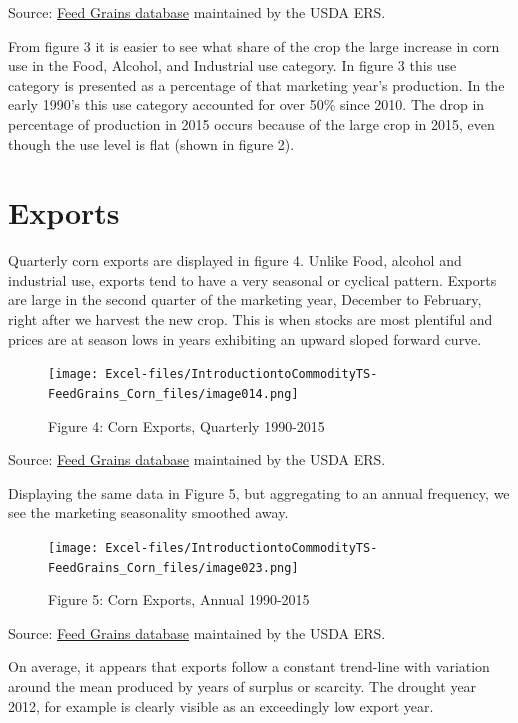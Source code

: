 \documentclass[
]{book}
\begin{document}
Source: \href{http://www.ers.usda.gov/data-products/feed-grains-database/feed-grains-yearbook-tables.aspx\#26780}{Feed Grains database} maintained by the USDA ERS.

From figure 3 it is easier to see what share of the crop the large increase in corn use in the Food, Alcohol, and Industrial use category. In figure 3 this use category is presented as a percentage of that marketing year's production. In the early 1990's this use category accounted for over 50\% since 2010. The drop in percentage of production in 2015 occurs because of the large crop in 2015, even though the use level is flat (shown in figure 2).

\hypertarget{exports}{%
\section{Exports}\label{exports}}

Quarterly corn exports are displayed in figure 4. Unlike Food, alcohol and industrial use, exports tend to have a very seasonal or cyclical pattern. Exports are large in the second quarter of the marketing year, December to February, right after we harvest the new crop. This is when stocks are most plentiful and prices are at season lows in years exhibiting an upward sloped forward curve.

\begin{figure}
\centering
\texttt{[image: Excel-files/IntroductiontoCommodityTS-FeedGrains\_Corn\_files/image014.png]}
\caption{Figure 4: Corn Exports, Quarterly 1990-2015}
\end{figure}

Source: \href{http://www.ers.usda.gov/data-products/feed-grains-database/feed-grains-yearbook-tables.aspx\#26780}{Feed Grains database} maintained by the USDA ERS.

Displaying the same data in Figure 5, but aggregating to an annual frequency, we see the marketing seasonality smoothed away.

\begin{figure}
\centering
\texttt{[image: Excel-files/IntroductiontoCommodityTS-FeedGrains\_Corn\_files/image023.png]}
\caption{Figure 5: Corn Exports, Annual 1990-2015}
\end{figure}

Source: \href{http://www.ers.usda.gov/data-products/feed-grains-database/feed-grains-yearbook-tables.aspx\#26780}{Feed Grains database} maintained by the USDA ERS.

On average, it appears that exports follow a constant trend-line with variation around the mean produced by years of surplus or scarcity. The drought year 2012, for example is clearly visible as an exceedingly low export year.
\end{document}
